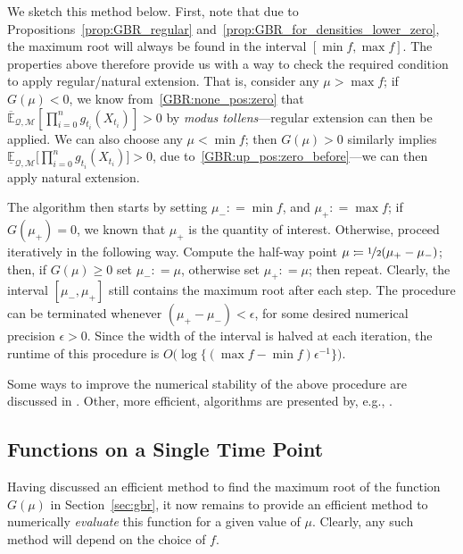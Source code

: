 \documentclass[twoside,11pt]{article}
\newcommand{\lexp}{\underline{\mathbb{E}}_{\rateset,\mathcal{M}}}
\newcommand{\uexp}{\overline{\mathbb{E}}_{\rateset,\mathcal{M}}}
\newcommand{\rateset}{\mathcal{Q}}
\newcommand{\coloneqq}{:\!=}
\begin{document}
We sketch this method below. First, note that due to Propositions~\ref{prop:GBR_regular} and~\ref{prop:GBR_for_densities_lower_zero}, the maximum root will always be found in the interval $[\min f, \max f]$. The properties above therefore provide us with a way to check the required condition to apply regular/natural extension. That is, consider any $\mu>\max f$; if $G(\mu)<0$, we know from~\ref{GBR:none_pos:zero} that $\uexp[\prod_{i=0}^n g_{t_i}(X_{t_i})]>0$ by \emph{modus tollens}---regular extension can then be applied. We can also choose any $\mu<\min f$; then $G(\mu)>0$ similarly implies $\lexp\bigl[\prod_{i=0}^n g_{t_i}(X_{t_i})\bigr]>0$, due to~\ref{GBR:up_pos:zero_before}---we can then apply natural extension.

The algorithm then starts by setting $\mu_-\coloneqq \min f$, and $\mu_+\coloneqq \max f$; if $G(\mu_+)=0$, we known that $\mu_+$ is the quantity of interest. Otherwise, proceed iteratively in the following way. Compute the half-way point $\mu\coloneqq \nicefrac{1}{2}(\mu_+-\mu_-)$; then, if $G(\mu)\geq 0$ set $\mu_-\coloneqq \mu$, otherwise set $\mu_+\coloneqq\mu$; then repeat. Clearly, the interval $[\mu_-,\mu_+]$ still contains the maximum root after each step. The procedure can be terminated whenever $(\mu_+-\mu_-)<\epsilon$, for some desired numerical precision $\epsilon>0$. Since the width of the interval is halved at each iteration, the runtime of this procedure is $O\bigl(\log\{(\max f - \min f)\epsilon^{-1}\}\bigr)$.

Some ways to improve the numerical stability of the above procedure are discussed in \cite[Section 2.7.3]{de2015credal}. Other, more efficient, algorithms are presented by, e.g., \citet{cozman1997alternatives}. %

\subsection{Functions on a Single Time Point}\label{sec:funcs_single_time}

Having discussed an efficient method to find the maximum root of the function $G(\mu)$ in Section~\ref{sec:gbr}, it now remains to provide an efficient method to numerically \emph{evaluate} this function for a given value of $\mu$. Clearly, any such method will depend on the choice of $f$.
\end{document}
